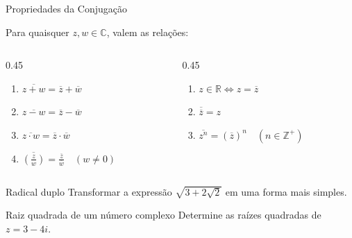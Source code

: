 \documentclass[10pt, aspectratio=169]{beamer}
\begin{document}
\begin{frame}{Propriedades da Conjugação}
  \begin{theorem}
    Para quaisquer $z, w \in \mathbb{C}$, valem as relações:
    \begin{columns}
      \begin{column}{0.45\textwidth}
        \begin{enumerate}
          \item $\overline{z + w} = \overline{z} + \overline{w}$
          \item $\overline{z - w} = \overline{z} - \overline{w}$
          \item $\overline{z \cdot w} = \overline{z} \cdot \overline{w}$
          \item $\overline{\left(\frac{z}{w}\right)} = \frac{\overline{z}}{\overline{w}} \quad (w \neq 0)$
        \end{enumerate}
      \end{column}
      
      \begin{column}{0.45\textwidth}
        \begin{enumerate}
          \item $z \in \mathbb{R} \iff z = \overline{z}$
          \item $\overline{\overline{z}} = z$
          \item $\overline{z^n} = (\overline{z})^n \quad (n \in \mathbb{Z}^+)$
        \end{enumerate}
      \end{column}
    \end{columns}
  \end{theorem}
\end{frame}


\begin{frame}[t]
  \begin{exampleblock}{Radical duplo}
  Transformar a expressão $\sqrt{3 + 2\sqrt{2}}$ em uma forma mais simples. \\
  \end{exampleblock}  
\end{frame}

\begin{frame}[t]
  \begin{exampleblock}{Raiz quadrada de um número complexo}
   Determine as raízes quadradas de $z = 3 - 4i$.
  \end{exampleblock}
 
\end{frame}
\end{document}
